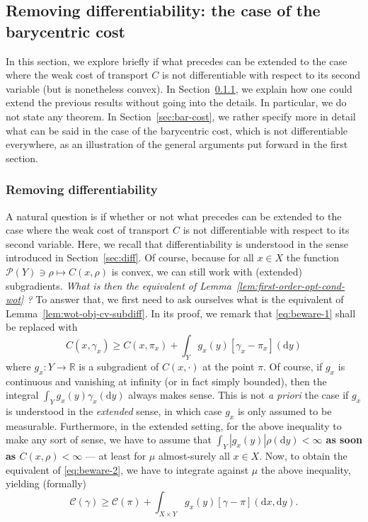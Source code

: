 \documentclass[leqno, 11pt, a4paper]{amsart}
\theoremstyle{definition}
\newcommand{\R}{\mathbb{R}}
\newcommand{\C}{\mathscr{C}}
\newcommand{\cP}{\mathcal{P}}
\newcommand{\dd}{\mathrm{d}}
\begin{document}
\subsection{Removing differentiability: the case of the barycentric cost}
In this section, we explore briefly if what precedes can be extended to the case where the weak cost of transport $C$ is not differentiable with respect to its second variable (but is nonetheless convex). In Section~\ref{sec:rem-dif}, we explain how one could extend the previous results without going into the details. In particular, we do not state any theorem. In Section~\ref{sec:bar-cost}, we rather specify more in detail what can be said in the case of the barycentric cost, which is not differentiable everywhere, as an illustration of the general arguments put forward in the first section. 
\subsubsection{Removing differentiability}\label{sec:rem-dif}
A natural question is if whether or not what precedes can be extended to the case where the weak cost of transport $C$ is not differentiable with respect to its second variable. Here, we recall that differentiability is understood in the sense introduced in Section~\ref{sec:diff}. Of course, because for all $x \in X$ the function $\cP(Y) \ni \rho \mapsto C(x, \rho)$ is convex, we can still work with (extended) subgradients. \textit{What is then the equivalent of Lemma~\ref{lem:first-order-opt-cond-wot} ?} To answer that, we first need to ask ourselves what is the equivalent of Lemma~\ref{lem:wot-obj-cv-subdiff}. In its proof, we remark that \eqref{eq:beware-1} shall be replaced with 
$$
C(x, \gamma_x) \geq C(x, \pi_x) + \int_{Y} g_x(y) [\gamma_x - \pi_x](\dd y)
$$
where $g_x : Y \to \R$ is a subgradient of $C(x, \cdot)$ at the point $\pi$. Of course, if $g_x$ is continuous and vanishing at infinity (or in fact simply bounded), then the integral $\int_{Y} g_x(y) \gamma_x(\dd y)$ always makes sense. This is not \textit{a priori} the case if $g_x$ is understood in the \textit{extended} sense, in which case $g_x$ is only assumed to be measurable. Furthermore, in the extended setting, for the above inequality to make any sort of sense, we have to assume that \textbf{$\int_{Y} |g_x(y)| \rho(\dd y) < \infty$ as soon as $C(x, \rho) < \infty$} --- at least for $\mu$ almost-surely all $x \in X$. Now, to obtain the equivalent of \eqref{eq:beware-2}, we have to integrate against $\mu$ the above inequality, yielding (formally)
$$
\C(\gamma) \geq \C(\pi) + \int_{X \times Y} g_x(y) [\gamma - \pi](\dd x,\dd y).
$$
\end{document}

